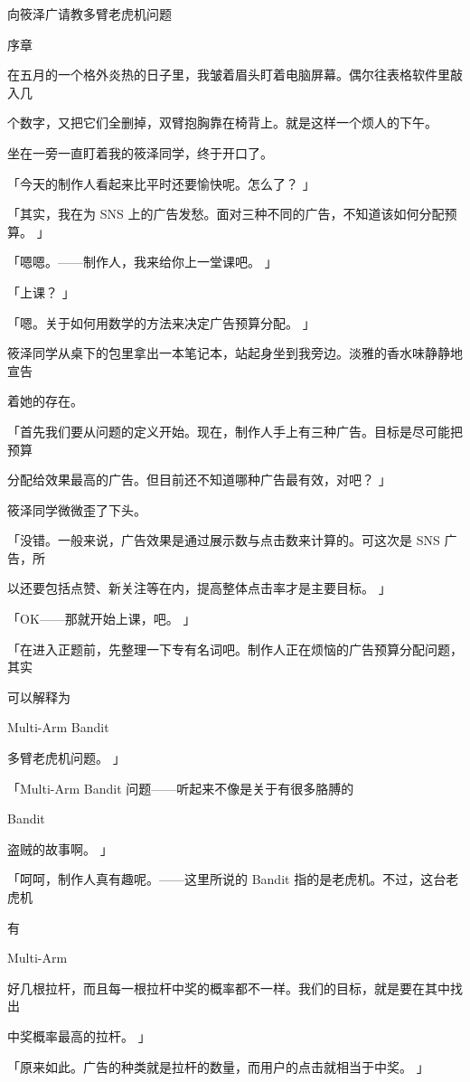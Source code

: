 向筱泽广请教多臂老虎机问题\par
序章\par
在五月的一个格外炎热的日子里，我皱着眉头盯着电脑屏幕。偶尔往表格软件里敲入几\par
个数字，又把它们全删掉，双臂抱胸靠在椅背上。就是这样一个烦人的下午。\par
坐在一旁一直盯着我的筱泽同学，终于开口了。\par
「今天的制作人看起来比平时还要愉快呢。怎么了？ 」\par
「其实，我在为 SNS 上的广告发愁。面对三种不同的广告，不知道该如何分配预算。 」\par
「嗯嗯。——制作人，我来给你上一堂课吧。 」\par
「上课？ 」\par
「嗯。关于如何用数学的方法来决定广告预算分配。 」\par
筱泽同学从桌下的包里拿出一本笔记本，站起身坐到我旁边。淡雅的香水味静静地宣告\par
着她的存在。\par
「首先我们要从问题的定义开始。现在，制作人手上有三种广告。目标是尽可能把预算\par
分配给效果最高的广告。但目前还不知道哪种广告最有效，对吧？ 」\par
筱泽同学微微歪了下头。\par
「没错。一般来说，广告效果是通过展示数与点击数来计算的。可这次是 SNS 广告，所\par
以还要包括点赞、新关注等在内，提高整体点击率才是主要目标。 」\par
「OK——那就开始上课，吧。 」\par
「在进入正题前，先整理一下专有名词吧。制作人正在烦恼的广告预算分配问题，其实\par
可以解释为\par
Multi-Arm Bandit\par
多臂老虎机问题。 」\par
「Multi-Arm Bandit 问题——听起来不像是关于有很多胳膊的\par
Bandit\par
盗贼的故事啊。 」\par
「呵呵，制作人真有趣呢。——这里所说的 Bandit 指的是老虎机。不过，这台老虎机\par
有\par
Multi-Arm\par
好几根拉杆，而且每一根拉杆中奖的概率都不一样。我们的目标，就是要在其中找出\par
中奖概率最高的拉杆。 」\par
「原来如此。广告的种类就是拉杆的数量，而用户的点击就相当于中奖。 」\par

